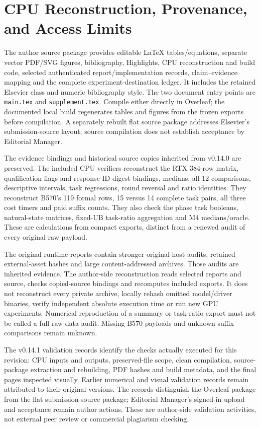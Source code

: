 \section{CPU Reconstruction, Provenance, and Access Limits}
\label{supp:reproducibility}
The author source package provides editable LaTeX tables/equations, separate vector PDF/SVG figures, bibliography, Highlights, CPU reconstruction and build code, selected authenticated report/implementation records, claim--evidence mapping and the complete experiment-destination ledger. It includes the retained Elsevier class and numeric bibliography style. The two document entry points are \texttt{main.tex} and \texttt{supplement.tex}. Compile either directly in Overleaf; the documented local build regenerates tables and figures from the frozen exports before compilation. A separately rebuilt flat source package addresses Elsevier's submission-source layout; source compilation does not establish acceptance by Editorial Manager.

The evidence bindings and historical source copies inherited from v0.14.0 are preserved. The included CPU verifiers reconstruct the RTX 384-row matrix, qualification flags and response-ID digest bindings, medians, all 12 comparisons, descriptive intervals, task regressions, round reversal and ratio identities. They reconstruct B570's 119 formal rows, 15 versus 14 complete task pairs, all three cost timers and paid suffix counts. They also check the phase task booleans, natural-state matrices, fixed-UB task-ratio aggregation and M4 medians/oracle. These are calculations from compact exports, distinct from a renewed audit of every original raw payload.

The original runtime reports contain stronger original-host audits, retained external-asset hashes and large content-addressed archives. Those audits are inherited evidence. The author-side reconstruction reads selected reports and source, checks copied-source bindings and recomputes included exports. It does not reconstruct every private archive, locally rehash omitted model/driver binaries, verify independent absolute execution time or run new GPU experiments. Numerical reproduction of a summary or task-ratio export must not be called a full raw-data audit. Missing B570 payloads and unknown suffix comparisons remain unknown.

The v0.14.1 validation records identify the checks actually executed for this revision: CPU inputs and outputs, preserved-file scope, clean compilation, source-package extraction and rebuilding, PDF hashes and build metadata, and the final pages inspected visually. Earlier numerical and visual validation records remain attributed to their original versions. The records distinguish the Overleaf package from the flat submission-source package; Editorial Manager's signed-in upload and acceptance remain author actions. These are author-side validation activities, not external peer review or commercial plagiarism checking.

